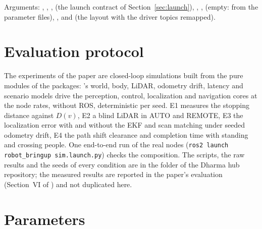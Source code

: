 Arguments: , , ,  (the
launch contract of Section~\ref{sec:launch}), , , 
(empty: from the parameter files), ,  and  (the
 layout with the driver topics remapped).

\section{Evaluation protocol}
\label{sec:eval-protocol}

The experiments of the paper are closed-loop simulations built from the pure 
modules of the packages: 's world, body, LiDAR, odometry drift, latency and
scenario models drive the perception, control, localization and navigation cores at the node
rates, without ROS, deterministic per seed. E1 measures the stopping distance against $D(v)$,
E2 a blind LiDAR in AUTO and REMOTE, E3 the localization error with and without the EKF and scan
matching under seeded odometry drift, E4 the path shift clearance and completion time with
standing and crossing people. One end-to-end run of the real nodes
(\texttt{ros2 launch robot\_bringup sim.launch.py}) checks the composition. The scripts, the raw
results and the seeds of every condition are in the  folder of the Dharma hub
repository; the measured results are reported in the paper's evaluation (Section~VI of
) and not duplicated here.

\section{Parameters}

\readonlynote


